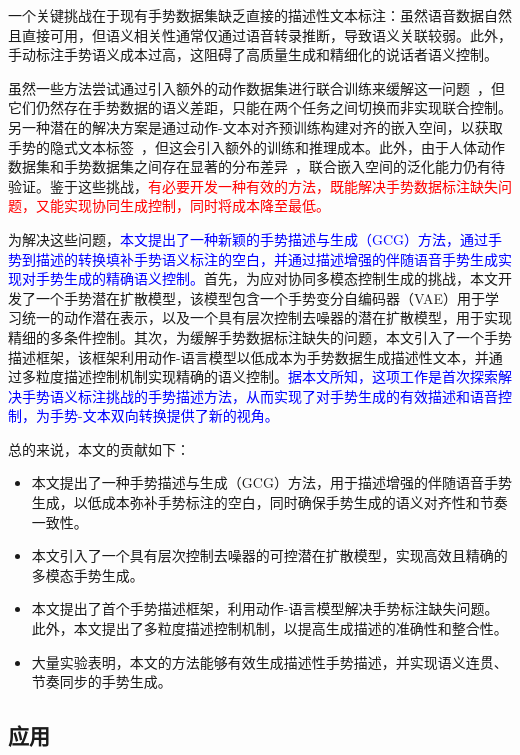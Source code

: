 一个关键挑战在于现有手势数据集缺乏直接的描述性文本标注：虽然语音数据自然且直接可用，但语义相关性通常仅通过语音转录推断，导致语义关联较弱。此外，手动标注手势语义成本过高，这阻碍了高质量生成和精细化的说话者语义控制。

虽然一些方法尝试通过引入额外的动作数据集进行联合训练来缓解这一问题~\cite{yang2024freetalker}，但它们仍然存在手势数据的语义差距，只能在两个任务之间切换而非实现联合控制。另一种潜在的解决方案是通过动作-文本对齐预训练构建对齐的嵌入空间，以获取手势的隐式文本标签~\cite{chen2024syntalker}，但这会引入额外的训练和推理成本。此外，由于人体动作数据集和手势数据集之间存在显著的分布差异~\cite{chen2024syntalker}，联合嵌入空间的泛化能力仍有待验证。鉴于这些挑战，\textcolor{red}{有必要开发一种有效的方法，既能解决手势数据标注缺失问题，又能实现协同生成控制，同时将成本降至最低。}

为解决这些问题，\textcolor{blue}{本文提出了一种新颖的手势描述与生成（GCG）方法，通过手势到描述的转换填补手势语义标注的空白，并通过描述增强的伴随语音手势生成实现对手势生成的精确语义控制。}首先，为应对协同多模态控制生成的挑战，本文开发了一个手势潜在扩散模型，该模型包含一个手势变分自编码器（VAE）用于学习统一的动作潜在表示，以及一个具有层次控制去噪器的潜在扩散模型，用于实现精细的多条件控制。其次，为缓解手势数据标注缺失的问题，本文引入了一个手势描述框架，该框架利用动作-语言模型以低成本为手势数据生成描述性文本，并通过多粒度描述控制机制实现精确的语义控制。\textcolor{blue}{据本文所知，这项工作是首次探索解决手势语义标注挑战的手势描述方法，从而实现了对手势生成的有效描述和语音控制，为手势-文本双向转换提供了新的视角。}

总的来说，本文的贡献如下：
\begin{itemize}
  \item 本文提出了一种手势描述与生成（GCG）方法，用于描述增强的伴随语音手势生成，以低成本弥补手势标注的空白，同时确保手势生成的语义对齐性和节奏一致性。
  \item 本文引入了一个具有层次控制去噪器的可控潜在扩散模型，实现高效且精确的多模态手势生成。
  \item 本文提出了首个手势描述框架，利用动作-语言模型解决手势标注缺失问题。此外，本文提出了多粒度描述控制机制，以提高生成描述的准确性和整合性。
  \item 大量实验表明，本文的方法能够有效生成描述性手势描述，并实现语义连贯、节奏同步的手势生成。
\end{itemize}

\subsection{应用}


